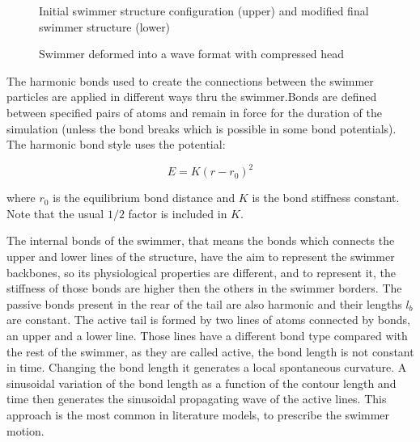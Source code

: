 \begin{figure}[ht]
\centering
  \begin{footnotesize}
  
  \caption[Initial swimmer structure configuration (upper) and modified final swimmer structure (lower)]{Initial swimmer structure configuration (upper) and modified final swimmer structure (lower)}
  \label{fig:Bild3}
  \end{footnotesize}
\end{figure} 

\begin{figure}[ht]
\centering
  \begin{footnotesize} 
  
  \caption[Swimmer deformed into a wave format with compressed head]{Swimmer deformed into a wave format with compressed head}
  \label{fig:Bild4}
  \end{footnotesize}
\end{figure} 

The harmonic bonds used to create the connections between the swimmer particles are applied in different ways thru the swimmer.Bonds are defined between specified pairs of 
atoms and remain in force for the duration of the simulation (unless the bond breaks which is possible in some bond potentials). The harmonic bond style uses the potential:


\begin{equation} 
  E = K ( r - r_{0})^2
\end{equation}

where $r_{0}$ is the equilibrium bond distance and $K$ is the bond stiffness constant. Note that the usual $1/2$ factor is included in $K$.

The internal bonds of the swimmer, that means the bonds which connects the upper and lower lines of the structure, have the aim to represent the swimmer backbones, so its 
physiological properties are different, and to represent it, the stiffness of those bonds are higher then the others in the swimmer borders. The passive bonds present in the 
rear of the tail are also harmonic and their lengths $l_{b}$ are constant. The active tail is formed by two lines of atoms connected by bonds, an upper and a lower line. Those
lines have a different bond type compared with the rest of the swimmer, as they are called active, the bond length is not constant in time. Changing the bond length it generates
a local spontaneous curvature. A sinusoidal variation of the bond length as a function of the contour length and time then generates the sinusoidal propagating wave of the active
lines. This approach is the most common in literature models, to prescribe the swimmer motion.\par

